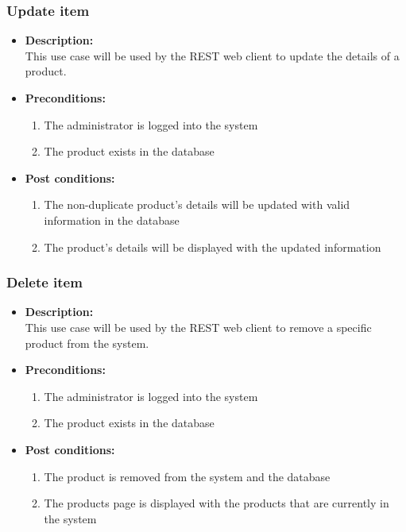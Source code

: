 \documentclass[a4paper,10pt]{article}
\begin{document}
\subsubsection{Update item}
\begin{itemize}
	\item \textbf {Description:}\\
	This use case will be used by the REST web client to update the details of a product.
	\item \textbf {Preconditions:}
		\begin{enumerate}
			\item The administrator is logged into the system
			\item The product exists in the database
		\end{enumerate}
	\item \textbf {Post conditions:}
		\begin{enumerate}
			\item The non-duplicate product’s details will be updated with valid information in the database
			\item The product’s details will be displayed with the updated information
		\end{enumerate}
\end{itemize}
\subsubsection{Delete item}
\begin{itemize}
	\item \textbf {Description:}\\
	This use case will be used by the REST web client to remove a specific product from the system.
	\item \textbf {Preconditions:}
		\begin{enumerate}
			\item The administrator is logged into the system
			\item The product exists in the database
		\end{enumerate}
	\item \textbf {Post conditions:}
		\begin{enumerate}
			\item The product is removed from the system and the database
			\item The products page is displayed with the products that are currently in the system
		\end{enumerate}
\end{itemize}
\end{document}
